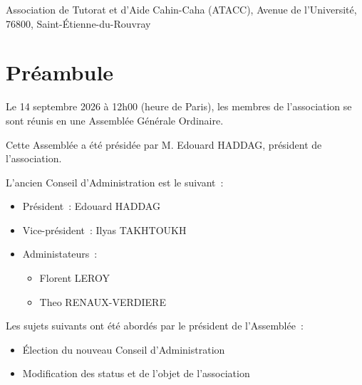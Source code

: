 \documentclass{article}
\date{\mydate}
\newcommand{\mydate}{14 septembre 2026}
\begin{document}
\begin{flushleft}
  Association de Tutorat et d'Aide Cahin-Caha (ATACC),
  \newline
  Avenue de l'Université, 76800, Saint-Étienne-du-Rouvray
\end{flushleft}

\vspace{10pt}

\setlength{\fboxsep}{10pt}
\noindent{}

\section{Préambule}
Le \mydate{} à 12h00 (heure de Paris), les membres de l'association se sont
réunis en une Assemblée Générale Ordinaire.
\newline
\begin{flushleft}
  Cette Assemblée a été présidée par M. Edouard HADDAG, président de
  l'association.
\end{flushleft}

\begin{flushleft}
  L'ancien Conseil d'Administration est le suivant~:

  \begin{itemize}
    \item Président~: Edouard HADDAG
    \item Vice-président~: Ilyas TAKHTOUKH
    \item Administateurs~:
      \begin{itemize}
        \item Florent LEROY
        \item Theo RENAUX-VERDIERE
      \end{itemize}
  \end{itemize}
\end{flushleft}

\begin{flushleft}
  Les sujets suivants ont été abordés par le président de l'Assemblée~:

  \begin{itemize}
    \item Élection du nouveau Conseil d'Administration
    \item Modification des status et de l'objet de l'association
  \end{itemize}
\end{flushleft}
\end{document}
